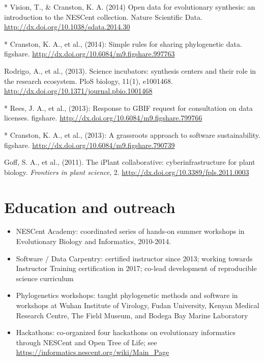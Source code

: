 \documentclass[10pt]{article}
\begin{document}
* Vision, T., \& Cranston, K. A. (2014) Open data for evolutionary synthesis: an introduction to the NESCent collection. Nature Scientific Data. \url{http://dx.doi.org/10.1038/sdata.2014.30}

* Cranston, K. A., et al., (2014): Simple rules for sharing phylogenetic data. figshare. \url{http://dx.doi.org/10.6084/m9.figshare.997763}

Rodrigo, A., et al., (2013). Science incubators: synthesis centers and their role in the research ecosystem. PloS biology, 11(1), e1001468. \url{http://dx.doi.org/10.1371/journal.pbio.1001468} 

* Rees, J. A., et al., (2013): Response to GBIF request for consultation on data licenses. figshare. \url{http://dx.doi.org/10.6084/m9.figshare.799766}

* Cranston, K. A., et al., (2013): A grassroots approach to software sustainability. figshare.
\url{http://dx.doi.org/10.6084/m9.figshare.790739}

Goff, S. A., et al., (2011). The iPlant collaborative: cyberinfrastructure for plant biology. \textit{Frontiers in plant science}, 2. \url{http://dx.doi.org/10.3389/fpls.2011.0003} 

\section*{Education and outreach}

\begin{itemize}
\item{NESCent Academy: coordinated series of hands-on summer workshops in Evolutionary Biology and Informatics, 2010-2014.}
\item{Software / Data Carpentry: certified instructor since 2013; working towards Instructor Training certification in 2017; co-lead development of reproducible science curriculum}
\item{Phylogenetics workshops: taught phylogenetic methods and software in workshops at Wuhan Institute of Virology, Fudan University, Kenyan Medical Research Centre, The Field Museum, and Bodega Bay Marine Laboratory} 
\item{Hackathons: co-organized four hackathons on evolutionary informatics through NESCent and Open Tree of Life; see \url{https://informatics.nescent.org/wiki/Main_Page}}
\end{itemize}

\end{document}
